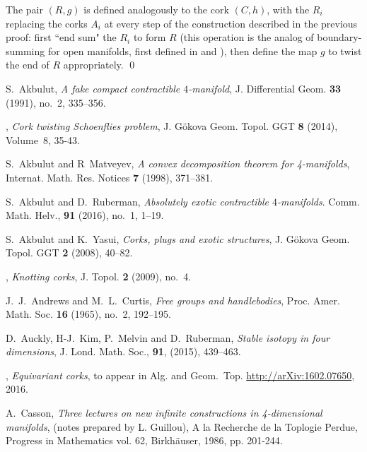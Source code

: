 \documentclass[11pt]{amsart}
\theoremstyle{definition}
\begin{document}
The pair $(R,g)$ is defined analogously to the cork $(C,h)$, with the $R_i$ replacing the corks  $A_i$ at every step of the construction described in the previous proof: first ``end sum" the $R_i$ to form $R$ (this operation is the analog of boundary-summing for open manifolds, first defined in \cite{gompf:3exoticR4} and \cite{gompf:infiniteexoticR4}), then define the map $g$ to twist the end of $R$ appropriately. \qed

 



\begin{thebibliography}{10}

S.~Akbulut, \emph{A fake compact contractible {$4$}-manifold}, J. Differential
  Geom. \textbf{33} (1991), no.~2, 335--356. %

\bysame,
\emph{Cork twisting Schoenflies problem}, J. G\"okova Geom. Topol. GGT {\bf 8} (2014), Volume~8, 35-43. %

S.~Akbulut and R~Matveyev, \emph{A convex decomposition theorem for 4-manifolds}, Internat. Math. Res. Notices \textbf{7} (1998), 371--381. 

S.~Akbulut and D.~Ruberman, {\em Absolutely exotic contractible $4$-manifolds}.  Comm. Math. Helv., \textbf{91} (2016), no.~1, 1--19. 
  
S.~Akbulut and K.~Yasui, \emph{Corks, plugs and exotic structures}, J.
  G\"okova Geom. Topol. GGT \textbf{2} (2008), 40--82. %

\bysame, \emph{Knotting corks}, J. Topol. {\bf 2} (2009), no.~4. %

J.~J.~Andrews and M.~L.~Curtis, \emph{Free groups and handlebodies}, Proc. Amer. Math. Soc. \textbf{16} (1965), no.~2, 192--195. %
  
D.~Auckly, H-J.~Kim, P.~Melvin and D.~Ruberman,
{\em Stable isotopy in four dimensions},
J. Lond. Math. Soc.,
\textbf{91}, (2015), 439--463.

\bysame,
{\em Equivariant corks}, to appear in Alg. and Geom.\ Top.
\newblock \url{http://arXiv:1602.07650}, 2016.

A.~Casson, \emph{Three lectures on new infinite constructions in 4-dimensional manifolds}, (notes prepared by L. Guillou), A la Recherche de la Toplogie Perdue, Progress in Mathematics vol. 62, Birkh\"auser, 1986, pp. 201-244. 


\end{thebibliography}
\end{document}
